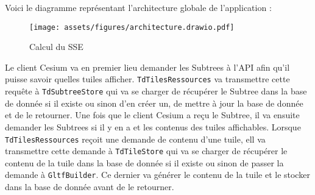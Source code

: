 Voici le diagramme représentant l'architecture globale de l'application :

\begin{figure}[H]
    \centering
    \texttt{[image: assets/figures/architecture.drawio.pdf]}
    \caption{Calcul du SSE \cite{3d-tiles-specification}}
    \label{fig:lods-colors}
\end{figure}

Le client Cesium va en premier lieu demander les Subtrees à l'API afin qu'il puisse savoir quelles tuiles afficher. \texttt{TdTilesRessources} va transmettre cette requête à \texttt{TdSubtreeStore} qui va se charger de récupérer le Subtree dans la base de donnée si il existe ou sinon d'en créer un, de mettre à jour la base de donnée et de le retourner. Une fois que le client Cesium a reçu le Subtree, il va ensuite demander les Subtrees si il y en a et les contenus des tuiles affichables. Lorsque \texttt{TdTilesRessources} reçoit une demande de contenu d'une tuile, ell va transmettre cette demande à \texttt{TdTileStore} qui va se charger de récupérer le contenu de la tuile dans la base de donnée si il existe ou sinon de passer la demande à \texttt{GltfBuilder}. Ce dernier va générer le contenu de la tuile et le stocker dans la base de donnée avant de le retourner.